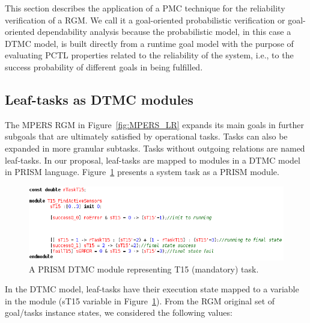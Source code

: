 This section describes the application of a PMC technique for the reliability verification of a RGM. We call it a goal-oriented probabilistic verification or goal-oriented dependability analysis because the probabilistic model, in this case a DTMC model, is built directly from a runtime goal model with the purpose of evaluating PCTL properties related to the reliability of the system, i.e., to the success probability of different goals in being fulfilled.


\subsection{Leaf-tasks as DTMC modules}


The MPERS RGM in Figure~\ref{fig:MPERS_LR} expands its main goals in further subgoals that are ultimately satisfied by operational tasks. Tasks can also be expanded in more granular subtasks. Tasks without outgoing relations are named leaf-tasks. In our proposal, leaf-tasks are mapped to modules in a DTMC model in PRISM language. Figure~\ref{fig:PRISM_TSK_MODULE} presents a system task as a PRISM module.


\begin{figure}[ht]
\centering
\includegraphics[width=1\textwidth]{imgs/PRISM_TSK_MODULE.png}
\caption{A PRISM DTMC module representing T15 (mandatory) task.}
\label{fig:PRISM_TSK_MODULE}
\end{figure}

In the DTMC model, leaf-tasks have their execution state mapped to a variable in the module (sT15 variable in Figure~\ref{fig:PRISM_TSK_MODULE}). From the RGM original set of goal/tasks instance states, we considered the following values:

